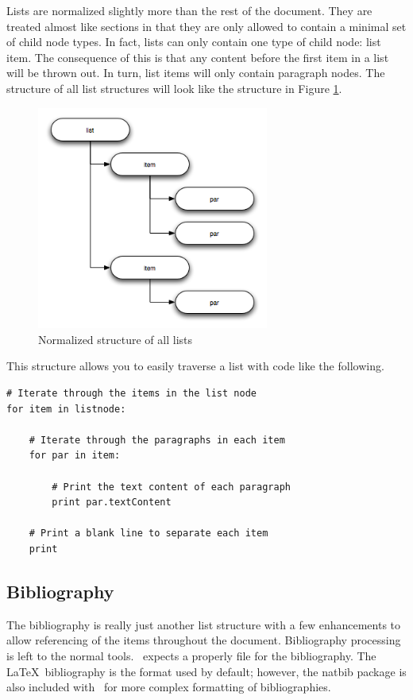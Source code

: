 Lists are normalized slightly more than the rest of the document.
They are treated almost like sections in that they are only allowed to
contain a minimal set of child node types.  In fact, lists can only
contain one type of child node: list item.  The consequence of this is that
any content before the first item in a list will be thrown out.  In turn, 
list items will only contain paragraph nodes.  The structure of all
list structures will look like the structure in Figure \ref{fig:liststruct}.

\begin{figure}[ht]
\begin{center}
\includegraphics[width=3in]{liststruct}
\end{center}
\caption{Normalized structure of all lists\label{fig:liststruct}}
\end{figure}

This structure allows you to easily traverse a list with code like the
following.
\begin{verbatim}
# Iterate through the items in the list node
for item in listnode:

    # Iterate through the paragraphs in each item
    for par in item:

        # Print the text content of each paragraph
        print par.textContent

    # Print a blank line to separate each item
    print
\end{verbatim}

\subsection{Bibliography}

The bibliography is really just another list structure with a few 
enhancements to allow referencing of the items throughout the document.
Bibliography processing is left to the normal tools.  \plasTeX\
expects a properly  file for the bibliography.  
The \LaTeX\ bibliography is the format used by default; however, 
the natbib package is also included with \plasTeX\ for more 
complex formatting of bibliographies.


